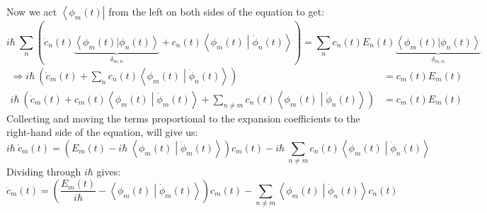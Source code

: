 \documentclass[12pt,a4paper]{article}
\begin{document}
	Now we act $\left\langle \phi_{m}(t) \right|$ from the left on both sides of the equation to get:
	\begin{equation}
		i \hbar\ \sum_{n} \left( \dot{c}_{n}(t) \underbrace{\left\langle \phi_{m}(t) | \phi_{n}(t) \right\rangle}_{\delta_{m,n}} + c_{n}(t) \left\langle \phi_{m}(t) \middle| \dot{\phi}_{n}(t) \right\rangle \right) = \sum_{n} c_{n}(t) E_{n}(t) \underbrace{\left\langle \phi_{m}(t) | \phi_{n}(t) \right\rangle}_{\delta_{m,n}}
	\end{equation}
	\begin{align}
		\Rightarrow i \hbar\ \left( \dot{c}_{m}(t) + \sum_{n} c_{n}(t) \left\langle \phi_{m}(t) \middle| \dot{\phi}_{n}(t) \right\rangle  \right) &= c_{m}(t) E_{m}(t) \\
		i \hbar\ \left( \dot{c}_{m}(t) + c_{m}(t) \left\langle \phi_{m}(t) \middle| \dot{\phi}_{m}(t) \right\rangle + \sum_{n \neq m} c_{n}(t) \left\langle \phi_{m}(t) \middle| \dot{\phi}_{n}(t) \right\rangle \right) &= c_{m}(t) E_{m}(t)		
		\label{eq:projected}
	\end{align} 
	Collecting and moving the terms proportional to the expansion coefficients to the right-hand side of the equation, will give us:
	\begin{equation}
		i \hbar\ \dot{c}_{m}(t) = \left( E_{m}(t) - i \hbar\ \left\langle \phi_{m}(t) \middle| \dot{\phi}_{m}(t) \right\rangle \right)c_{m}(t) - i \hbar\ \sum_{n \neq m} c_{n}(t) \left\langle \phi_{m}(t) \middle| \dot{\phi}_{n}(t) \right\rangle
		\label{eq:coupled_odes}
	\end{equation}
	Dividing through $i \hbar$ gives:
	\begin{equation}
		\dot{c}_{m}(t) = \left( \frac{E_{m}(t)}{i \hbar} - \left\langle \phi_{m}(t) \middle| \dot{\phi}_{m}(t) \right\rangle \right)c_{m}(t) - \sum_{n \neq m} \left\langle \phi_{m}(t) \middle| \dot{\phi}_{n}(t) \right\rangle c_{n}(t)
		\label{eq:coupled_odes_simplified}
	\end{equation}
	
\end{document}
